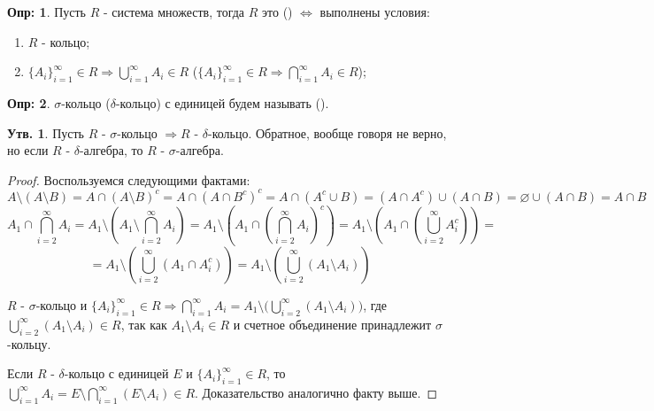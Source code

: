 \documentclass[12pt]{article}
\newcommand{\VN}{\varnothing}
\theoremstyle{definition}
\newtheorem{defn}{Опр:}
\newtheorem{prop}{Утв.}
\begin{document}
\begin{defn}
	Пусть $R$ - система множеств, тогда $R$ это  () $\Leftrightarrow$ выполнены условия: 
	\begin{enumerate}[label={(\arabic*)}]
		\item $R$ - кольцо;
		\item $\{A_i\}_{i=1}^{\infty} \in R \Rightarrow \bigcup\limits_{i=1}^{\infty} A_i \in R$ \bigg($\{A_i\}_{i=1}^{\infty} \in R \Rightarrow \bigcap\limits_{i=1}^{\infty} A_i \in R$\bigg);
	\end{enumerate}
\end{defn}

\begin{defn}
	$\sigma$-кольцо ($\delta$-кольцо) с  единицей будем называть  ().
\end{defn}

\begin{prop}
	Пусть $R$ - $\sigma$-кольцо $\Rightarrow R$ - $\delta$-кольцо. Обратное, вообще говоря не верно, но если $R$ - $\delta$-алгебра, то $R$ - $\sigma$-алгебра.
\end{prop}

\begin{proof}
	Воспользуемся следующими фактами:
	$$
		A \setminus (A \setminus B) = A \cap (A \setminus B)^c = A \cap (A \cap B^c)^c = A \cap (A^c \cup B) = (A \cap A^c) \cup (A \cap B) = \VN \cup (A \cap B) = A \cap B
	$$
	$$
		A_1 \cap \bigcap\limits_{i = 2}^{\infty}A_i = A_1 \setminus \left(A_1 \setminus \bigcap\limits_{i = 2}^{\infty}A_i \right) = A_1 \setminus \left(A_1 \cap \left(\bigcap\limits_{i = 2}^{\infty}A_i\right)^c \right) = A_1 \setminus \left(A_1 \cap  \left( \bigcup\limits_{i = 2}^{\infty}A_i^c \right) \right) = 
	$$
	$$
		= A_1 \setminus \left(\bigcup\limits_{i = 2}^{\infty} (A_1 \cap A_i^c)\right) = A_1 \setminus \left(\bigcup\limits_{i = 2}^{\infty} (A_1 \setminus A_i)\right)
	$$
	
	$R$ - $\sigma$-кольцо и $\{A_i\}_{i=1}^{\infty} \in R \Rightarrow \bigcap\limits_{i=1}^{\infty} A_i = A_1 \setminus \bigg( \bigcup\limits_{i=2}^{\infty} (A_1 \setminus A_i) \bigg)$, где $\bigcup\limits_{i=2}^{\infty} (A_1 \setminus A_i) \in R$, так как $A_1 \setminus A_i \in R$ и счетное объединение принадлежит $\sigma$-кольцу.
	
	Если $R$ - $\delta$-кольцо с единицей $E$ и $\{A_i\}_{i=1}^{\infty} \in R$, то $\bigcup\limits_{i=1}^{\infty} A_i = E \setminus \bigcap\limits_{i=1}^{\infty} (E \setminus A_i) \in R$. Доказательство аналогично факту выше.
\end{proof}
\end{document}
